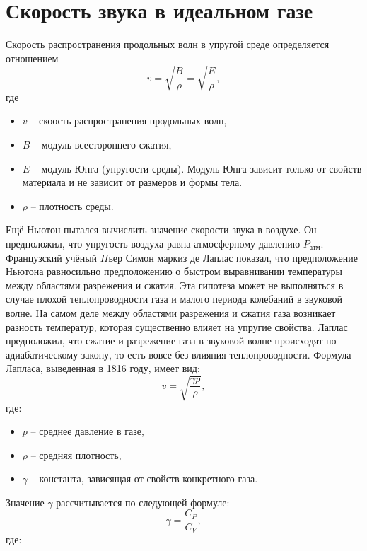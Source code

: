 \documentclass[referat,times]{SCWorks}
\begin{document}
\section{Скорость звука в идеальном газе}
Скорость распространения продольных волн в упругой среде определяется отношением
\begin{equation}
    v = \sqrt{\frac{B}{\rho}} = \sqrt{\frac E \rho},
\end{equation}
где
\begin{itemize}
    \item $v$ -- скоость распространения продольных волн,
    \item $B$ -- модуль всестороннего сжатия,
    \item $E$ -- модуль Юнга (упругости среды). Модуль Юнга зависит только от свойств материала и не зависит от размеров и формы тела.
    \item $\rho$ -- плотность среды.
\end{itemize}
\par Ещё Ньютон пытался вычислить значение скорости звука в воздухе. Он предположил, что упругость воздуха равна атмосферному давлению $P_{атм}$. Французский учёный $\Pi$ьер Симон маркиз де Лаплас показал, что предположение Ньютона равносильно предположению о быстром выравнивании температуры между областями разрежения и сжатия. Эта гипотеза может не выполняться в случае плохой теплопроводности газа и малого периода колебаний в звуковой волне. На самом деле между областями разрежения и сжатия газа возникает разность температур, которая существенно влияет на упругие свойства. Лаплас предположил, что сжатие и разрежение газа в звуковой волне происходят по адиабатическому закону, то есть вовсе без влияния теплопроводности. Формула Лапласа, выведенная в 1816 году, имеет вид:
\begin{equation}
    v = \sqrt{\frac{\gamma p}{\rho}},
\end{equation}
где:
\begin{itemize}
    \item $p$ -- среднее давление в газе,
    \item $\rho$ -- средняя плотность,
    \item $\gamma$ -- константа, зависящая от свойств конкретного газа.
\end{itemize}
\par Значение $\gamma$ рассчитывается по следующей формуле:
\begin{equation}
    \gamma = \frac{C_P}{C_V},
\end{equation}
где:
\end{document}
